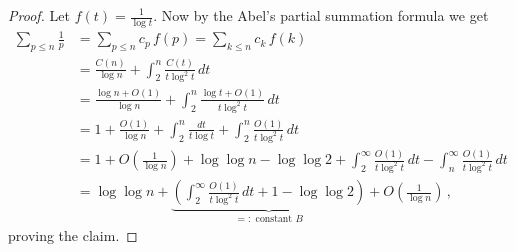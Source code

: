 \documentclass{article}
\begin{document}
\begin{theorem}
\begin{proof}
Let $f(t)=\frac{1}{\log t}$. Now by the Abel's partial summation formula we get
\begin{align*}
    \sum_{p\leq n} \frac{1}{p} & = \sum_{p\leq n} c_p\,f(p) = \sum_{k\leq n} c_k\,f(k)\\
    & = \frac{C(n)}{\log n} + \int_2^n \frac{C(t)}{t\log^2 t}\,dt\\
    & = \frac{\log n + O(1)}{\log n} + \int_2^n \frac{\log t + O(1)}{t\log^2 t}\,dt\\
    & = 1 + \frac{O(1)}{\log n} + \int_2^n \frac{dt}{t \log t} + \int_2^n \frac{O(1)}{t \log^2 t}\,dt\\
    & = 1 + O\left(\frac{1}{\log n}\right) + \log\log n - \log\log 2 + \int_2^\infty \frac{O(1)}{t \log^2 t}\,dt - \int_n^\infty \frac{O(1)}{t \log^2 t}\,dt\\
    & = \log\log n + \underbrace{\left(\int_2^\infty \frac{O(1)}{t \log^2 t}\,dt + 1 - \log \log 2\right)}_\text{$=:$ constant $B$} + O\left(\frac{1}{\log n}\right)\,,
\end{align*}
proving the claim.

\end{proof}

\end{theorem}
\end{document}

